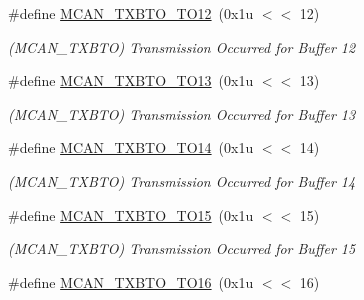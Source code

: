 \begin{DoxyCompactItemize}
\mbox{\label{group__SAMV71__MCAN_ga08a62772db5b5fc55044adea722b1c6f}} 
\#define \mbox{\hyperlink{group__SAMV71__MCAN_ga08a62772db5b5fc55044adea722b1c6f}{M\+C\+A\+N\+\_\+\+T\+X\+B\+T\+O\+\_\+\+T\+O12}}~(0x1u $<$$<$ 12)
\begin{DoxyCompactList}\small\item\em (M\+C\+A\+N\+\_\+\+T\+X\+B\+TO) Transmission Occurred for Buffer 12 \end{DoxyCompactList}\item 
\mbox{\label{group__SAMV71__MCAN_ga73cb8b1398a4b5137f435cce0c0a2bf5}} 
\#define \mbox{\hyperlink{group__SAMV71__MCAN_ga73cb8b1398a4b5137f435cce0c0a2bf5}{M\+C\+A\+N\+\_\+\+T\+X\+B\+T\+O\+\_\+\+T\+O13}}~(0x1u $<$$<$ 13)
\begin{DoxyCompactList}\small\item\em (M\+C\+A\+N\+\_\+\+T\+X\+B\+TO) Transmission Occurred for Buffer 13 \end{DoxyCompactList}\item 
\mbox{\label{group__SAMV71__MCAN_gaf306d3ca1b72c7119a5b7fe843f87891}} 
\#define \mbox{\hyperlink{group__SAMV71__MCAN_gaf306d3ca1b72c7119a5b7fe843f87891}{M\+C\+A\+N\+\_\+\+T\+X\+B\+T\+O\+\_\+\+T\+O14}}~(0x1u $<$$<$ 14)
\begin{DoxyCompactList}\small\item\em (M\+C\+A\+N\+\_\+\+T\+X\+B\+TO) Transmission Occurred for Buffer 14 \end{DoxyCompactList}\item 
\mbox{\label{group__SAMV71__MCAN_ga9dd9ccf58286d9fb598eaf60b5475cb4}} 
\#define \mbox{\hyperlink{group__SAMV71__MCAN_ga9dd9ccf58286d9fb598eaf60b5475cb4}{M\+C\+A\+N\+\_\+\+T\+X\+B\+T\+O\+\_\+\+T\+O15}}~(0x1u $<$$<$ 15)
\begin{DoxyCompactList}\small\item\em (M\+C\+A\+N\+\_\+\+T\+X\+B\+TO) Transmission Occurred for Buffer 15 \end{DoxyCompactList}\item 
\mbox{\label{group__SAMV71__MCAN_gaecedba64cdb0073292d2826427e41774}} 
\#define \mbox{\hyperlink{group__SAMV71__MCAN_gaecedba64cdb0073292d2826427e41774}{M\+C\+A\+N\+\_\+\+T\+X\+B\+T\+O\+\_\+\+T\+O16}}~(0x1u $<$$<$ 16)
$$
\end{DoxyCompactItemize}

